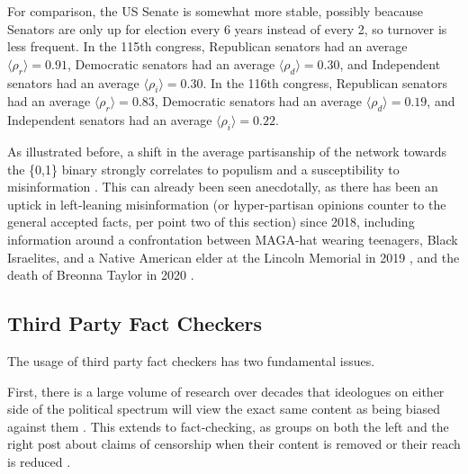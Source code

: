 \documentclass[NETN,manuscript]{stjour-new}
\begin{document}
 For comparison, the US Senate is somewhat more stable, possibly beacause Senators are only up for election every 6 years instead of every 2, so turnover is less frequent. In the 115th congress, Republican senators had an average $\langle \rho_r \rangle = 0.91$, Democratic senators had an average $\langle \rho_d \rangle = 0.30$, and Independent senators had an average $\langle \rho_i \rangle = 0.30$. In the 116th congress, Republican senators had an average $\langle \rho_r \rangle = 0.83$, Democratic senators had an average $\langle \rho_d \rangle = 0.19$, and Independent senators had an average $\langle \rho_i \rangle = 0.22$.
 
 As illustrated before, a shift in the average partisanship of the network towards the \{0,1\} binary strongly correlates to populism and a susceptibility to misinformation \citep{hopp2020people,kahan2012ideology,mourao2019fake,shin2017partisan,swire2017processing,vargo2018agenda}. This can already been seen anecdotally, as there has been an uptick in left-leaning misinformation (or hyper-partisan opinions counter to the general accepted facts, per point two of this section)  since 2018, including information around a confrontation between MAGA-hat wearing teenagers, Black Israelites, and a Native American elder at the Lincoln Memorial in 2019 \citep{sacks2019maga,healy2019believing,pond2020complexity}, and the death of Breonna Taylor in 2020 \citep{duvall2020fact,kim2020fact}. 

 \subsection{Third Party Fact Checkers}
 The usage of third party fact checkers has two fundamental issues.
 
 First, there is a large volume of research over decades that ideologues on either side of the political spectrum will view the exact same content as being biased against them \citep{arpan2003experimental,baum2008eye,christen2002hostile,gunther2001predicting,gunther2004mapping,baum2004issue,gussin2004eye,lee2005liberal,vallone1985hostile}. This extends to fact-checking, as groups on both the left and the right post about claims of censorship when their content is removed or their reach is reduced \citep{Dreyfuss2020Now,Post2020Facebook,Millhiser2018Facebook}. 
 
\end{document}
